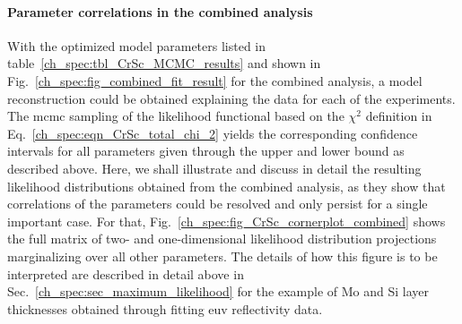 \paragraph{Parameter correlations in the combined analysis}
With the optimized model parameters listed in table~\ref{ch_spec:tbl_CrSc_MCMC_results} and shown in Fig.~\ref{ch_spec:fig_combined_fit_result} for the combined analysis, a model reconstruction could be obtained explaining the data for each of the experiments. The \gls{mcmc} sampling of the likelihood functional based on the $\chi^2$ definition in Eq.~\eqref{ch_spec:eqn_CrSc_total_chi_2} yields the corresponding confidence intervals for all parameters given through the upper and lower bound as described above. Here, we shall illustrate and discuss in detail the resulting likelihood distributions obtained from the combined analysis, as they show that correlations of the parameters could be resolved and only persist for a single important case. For that, Fig.~\ref{ch_spec:fig_CrSc_cornerplot_combined} shows the full matrix of two- and one-dimensional likelihood distribution projections marginalizing over all other parameters. The details of how this figure is to be interpreted are described in detail above in Sec.~\ref{ch_spec:sec_maximum_likelihood} for the example of Mo and Si layer thicknesses obtained through fitting \gls{euv} reflectivity data.
